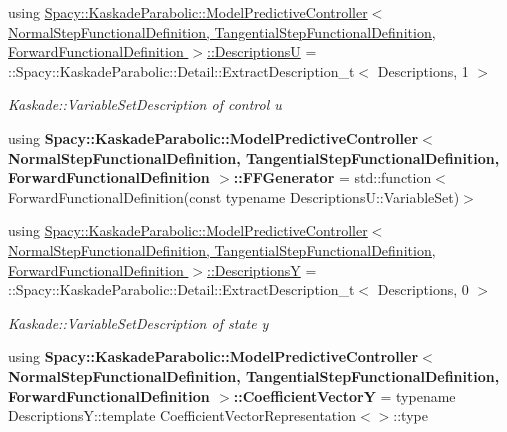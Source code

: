 \begin{DoxyCompactItemize}
\item 
\hypertarget{group__KaskadeParabolicGroup_ga040dd0e071b5500d2c4a49be5147cdc3}{using \hyperlink{group__KaskadeParabolicGroup_ga040dd0e071b5500d2c4a49be5147cdc3}{Spacy\-::\-Kaskade\-Parabolic\-::\-Model\-Predictive\-Controller$<$ Normal\-Step\-Functional\-Definition, Tangential\-Step\-Functional\-Definition, Forward\-Functional\-Definition $>$\-::\-Descriptions\-U} = \-::Spacy\-::\-Kaskade\-Parabolic\-::\-Detail\-::\-Extract\-Description\-\_\-t$<$ Descriptions, 1 $>$}\label{group__KaskadeParabolicGroup_ga040dd0e071b5500d2c4a49be5147cdc3}

\begin{DoxyCompactList}\small\item\em Kaskade\-::\-Variable\-Set\-Description of control u \end{DoxyCompactList}\item 
\hypertarget{group__KaskadeParabolicGroup_ga15c2ea1e40830aa86fe931710ec1c050}{using {\bfseries Spacy\-::\-Kaskade\-Parabolic\-::\-Model\-Predictive\-Controller$<$ Normal\-Step\-Functional\-Definition, Tangential\-Step\-Functional\-Definition, Forward\-Functional\-Definition $>$\-::\-F\-F\-Generator} = std\-::function$<$ Forward\-Functional\-Definition(const typename Descriptions\-U\-::\-Variable\-Set)$>$}\label{group__KaskadeParabolicGroup_ga15c2ea1e40830aa86fe931710ec1c050}

\item 
\hypertarget{group__KaskadeParabolicGroup_ga68cff5860ecaab2ac4f6ea66c76ecb2c}{using \hyperlink{group__KaskadeParabolicGroup_ga68cff5860ecaab2ac4f6ea66c76ecb2c}{Spacy\-::\-Kaskade\-Parabolic\-::\-Model\-Predictive\-Controller$<$ Normal\-Step\-Functional\-Definition, Tangential\-Step\-Functional\-Definition, Forward\-Functional\-Definition $>$\-::\-Descriptions\-Y} = \-::Spacy\-::\-Kaskade\-Parabolic\-::\-Detail\-::\-Extract\-Description\-\_\-t$<$ Descriptions, 0 $>$}\label{group__KaskadeParabolicGroup_ga68cff5860ecaab2ac4f6ea66c76ecb2c}

\begin{DoxyCompactList}\small\item\em Kaskade\-::\-Variable\-Set\-Description of state y \end{DoxyCompactList}\item 
\hypertarget{group__KaskadeParabolicGroup_gaf8c5e30f599791c3a9df7ca678260162}{using {\bfseries Spacy\-::\-Kaskade\-Parabolic\-::\-Model\-Predictive\-Controller$<$ Normal\-Step\-Functional\-Definition, Tangential\-Step\-Functional\-Definition, Forward\-Functional\-Definition $>$\-::\-Coefficient\-Vector\-Y} = typename Descriptions\-Y\-::template Coefficient\-Vector\-Representation$<$$>$\-::type}\label{group__KaskadeParabolicGroup_gaf8c5e30f599791c3a9df7ca678260162}

\end{DoxyCompactItemize}
